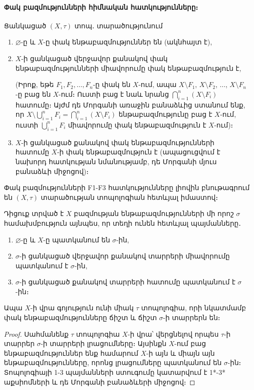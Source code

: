 \documentclass[./main.tex]{subfiles}
\begin{document}
\paragraph{Փակ բազմությունների հիմնական հատ\-կու\-թյուն\-նե\-րը։} Ցանկացած $(X,\tau)$ տոպ․ տա\-րա\-ծութ\-յունում
\begin{enumerate}
    \item[F1.] $\varnothing$-ը և $X$-ը փակ ենթաբազմություններ են (ակնհայտ է),
    \item[F2.] $X$-ի ցանկացած վերջավոր քանակով փակ ենթաբազմությունների միա\-վո\-րու\-մը փակ ենթաբազմություն է,
    \par (Իրոք, եթե $F_1, F_2, \dots,  F_n$-ը փակ են $X$-ում, ապա $X\setminus F_1$, $X\setminus F_2$, $\dots$, ${X\setminus F_n}$-ը բաց են $X$-ում։ Ուստի բաց է նաև նրանց $\bigcap\limits_{i=1}^n (X\setminus F_i)$  հատումը։ Այժմ դե Մորգանի առաջին բանաձևից ստանում ենք, որ $X\setminus \bigcup\limits_{i=1}^n F_i = \bigcap\limits_{i=1}^n (X\setminus F_i)$ ենթաբազմությունը բաց է $X$-ում, ուստի $\bigcup\limits_{i=1}^n F_i$ միավորումը փակ ենթա\-բազ\-մու\-թյուն է $X$-ում)։
    \item[F3.] $X$-ի ցանկացած քանակով փակ ենթաբազմությունների հատումը $X$-ի փակ ենթաբազմություն է (ապացուցվում է նախորդ հատկության նմանությամբ, դե Մոր\-գա\-նի մյուս բանաձևի միջոցով)։
\end{enumerate}
\par Փակ բազմությունների F1-F3 հատկությունները լիովին բնութագրում են $(X,\tau )$ տարածության տոպո\-լոգիան հետևյալ իմաստով։
\begin{theorem}\label{ch5thm3}
Դիցուք տրված է $X$ բազմության ենթաբազմությունների մի որոշ $\sigma$ համախմբություն այնպես, որ տեղի ունեն հետևյալ պայմանները․
\begin{enumerate}
    \item[1*.] $\varnothing$-ը և $X$-ը պատկանում են $\sigma$-ին,
    \item[2*.] $\sigma$-ի ցանկացած վերջավոր քանակով տարրերի միավորումը պատկանում է $\sigma\textrm{-ին}$,
    \item[3*.] $\sigma$-ի ցանկացած քանակով տարրերի հատումը պատկանում է $\sigma$-ին։
\end{enumerate}
\par Ապա $X$-ի վրա գոյություն ունի միակ $\tau$ տոպո\-լոգիա, որի նկատմամբ փակ են\-թա\-բազ\-մու\-թյուն\-նե\-րը ճիշտ և ճիշտ $\sigma$-ի տարրերն են։
\end{theorem} 
\begin{proof}
Սահմանենք $\tau $ տոպո\-լոգիա $X$-ի վրա՝ վերցնելով որպես $\tau$-ի տար\-րեր $\sigma$-ի տարրերի լրացումները։ Այսինքն $X$-ում բաց ենթաբազմություններ ենք հա\-մա\-րում $X$-ի այն և միայն այն ենթաբազմությունները, որոնց լրացումները պատ\-կա\-նում են $\sigma$-ին։ Տոպո\-լոգիայի 1-3 պայմանների ստուգումը կատարվում է 1*-3* աք\-սիոմ\-նե\-րի և դե Մորգանի բանաձևերի միջոցով։ 
\end{proof}
\end{document}
